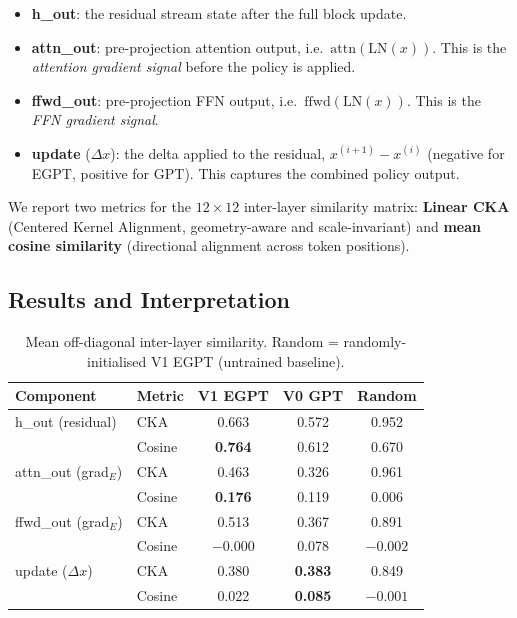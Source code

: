 \documentclass[11pt,a4paper]{article}
\begin{document}
\begin{itemize}
  \item \textbf{h\_out}: the residual stream state after the full block update.
  \item \textbf{attn\_out}: pre-projection attention output, i.e.\ $\mathrm{attn}(\mathrm{LN}(x))$.
    This is the \emph{attention gradient signal} before the policy is applied.
  \item \textbf{ffwd\_out}: pre-projection FFN output, i.e.\ $\mathrm{ffwd}(\mathrm{LN}(x))$.
    This is the \emph{FFN gradient signal}.
  \item \textbf{update} ($\Delta x$): the delta applied to the residual,
    $x^{(i+1)} - x^{(i)}$ (negative for EGPT, positive for GPT).
    This captures the combined policy output.
\end{itemize}

We report two metrics for the $12 \times 12$ inter-layer similarity matrix:
\textbf{Linear CKA} (Centered Kernel Alignment, geometry-aware and scale-invariant)
and \textbf{mean cosine similarity} (directional alignment across token positions).

\subsection{Results and Interpretation}

\begin{table}[h]
\centering
\caption{Mean off-diagonal inter-layer similarity.
  Random = randomly-initialised V1 EGPT (untrained baseline).}
\label{tab:layer_sim}
\small
\setlength{\tabcolsep}{5pt}
\begin{tabular}{llccc}
\toprule
\textbf{Component} & \textbf{Metric} & \textbf{V1 EGPT} & \textbf{V0 GPT} & \textbf{Random} \\
\midrule
h\_out (residual)     & CKA    & 0.663 & 0.572 & 0.952 \\
                      & Cosine & \textbf{0.764} & 0.612 & 0.670 \\
\midrule
attn\_out (grad$_E$)  & CKA    & 0.463 & 0.326 & 0.961 \\
                      & Cosine & \textbf{0.176} & 0.119 & 0.006 \\
\midrule
ffwd\_out (grad$_E$)  & CKA    & 0.513 & 0.367 & 0.891 \\
                      & Cosine & $-0.000$ & 0.078 & $-0.002$ \\
\midrule
update ($\Delta x$)   & CKA    & 0.380 & \textbf{0.383} & 0.849 \\
                      & Cosine & 0.022 & \textbf{0.085} & $-0.001$ \\
\bottomrule
\end{tabular}
\end{table}
\end{document}
